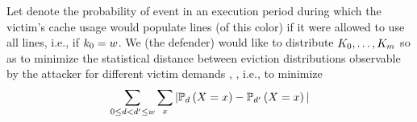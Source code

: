 Let \prob{\victimDemand}{\genericEvent} denote the probability of
event \genericEvent in an execution period during which the victim's
cache usage would populate \victimDemand lines (of this color) if it
were allowed to use all \cacheLineNmbr lines, i.e., if
$k_{0} = w$.  We (the defender) would
like to distribute $K_{0}, \ldots,
K_{m}$
so as to minimize the statistical distance between eviction
distributions observable by the attacker for different victim demands
\victimDemand, \victimDemandAlt, i.e., to minimize
\begin{align}
\sum_{0 \le d < d' \le w} \sum_{x} |\mathbb{P}_{d}\left({X = x}\right) - \mathbb{P}_{d'}\left({X = x}\right)|
\label{eqn:securityGoal}
\end{align}

